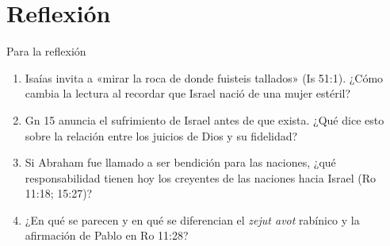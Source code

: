 \documentclass[hyperref={bookmarks=false},aspectratio=169]{beamer}
\begin{document}
\section{Reflexión}
\begin{frame}{Para la reflexión}
\begin{enumerate}\setlength{\itemsep}{10pt}
\item Isaías invita a «mirar la roca de donde fuisteis tallados» (Is 51:1). ¿Cómo cambia la lectura al recordar que Israel nació de una mujer estéril?
\item Gn 15 anuncia el sufrimiento de Israel antes de que exista. ¿Qué dice esto sobre la relación entre los juicios de Dios y su fidelidad?
\item Si Abraham fue llamado a ser bendición para las naciones, ¿qué responsabilidad tienen hoy los creyentes de las naciones hacia Israel (Ro 11:18; 15:27)?
\item ¿En qué se parecen y en qué se diferencian el \emph{zejut avot} rabínico y la afirmación de Pablo en Ro 11:28?
\end{enumerate}
\end{frame}

\end{document}
